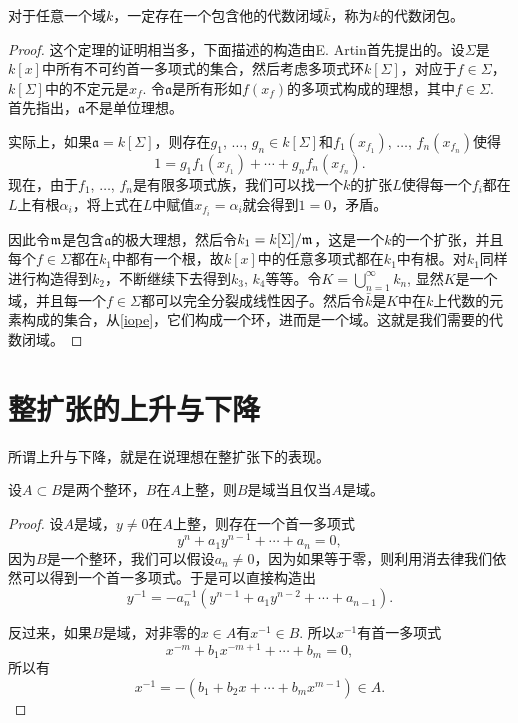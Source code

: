 \begin{thm}
对于任意一个域$k$，一定存在一个包含他的代数闭域$\bar{k}$，称为$k$的代数闭包。
\end{thm}

\begin{proof}
	这个定理的证明相当多，下面描述的构造由E. Artin首先提出的。设$\Sigma$是$k[x]$中所有不可约首一多项式的集合，然后考虑多项式环$k[\Sigma]$，对应于$f\in\Sigma$，$k[\Sigma]$中的不定元是$x_f$. 令$\mathfrak{a}$是所有形如$f(x_f)$的多项式构成的理想，其中$f\in\Sigma$. 首先指出，$\mathfrak{a}$不是单位理想。

	实际上，如果$\mathfrak{a}=k[\Sigma]$，则存在$g_1$, $\dots$, $g_n\in k[\Sigma]$和$f_1(x_{f_1})$, $\dots$, $f_n(x_{f_n})$使得
	\[
	1=g_1f_1(x_{f_1})+\cdots +g_nf_n(x_{f_n}).
	\]
	现在，由于$f_1$, $\dots$, $f_n$是有限多项式族，我们可以找一个$k$的扩张$L$使得每一个$f_i$都在$L$上有根$\alpha_i$，将上式在$L$中赋值$x_{f_i}=\alpha_i$就会得到$1=0$，矛盾。

	因此令$\mathfrak{m}$是包含$\mathfrak{a}$的极大理想，然后令$k_1=k[\Sigma]/\mathfrak{m}$，这是一个$k$的一个扩张，并且每个$f\in \Sigma$都在$k_1$中都有一个根，故$k[x]$中的任意多项式都在$k_1$中有根。对$k_1$同样进行构造得到$k_2$，不断继续下去得到$k_3$, $k_4$等等。令$K=\bigcup_{n=1}^\infty k_n$, 显然$K$是一个域，并且每一个$f\in \Sigma$都可以完全分裂成线性因子。然后令$\bar{k}$是$K$中在$k$上代数的元素构成的集合，从\ref{iope}，它们构成一个环，进而是一个域。这就是我们需要的代数闭域。
\end{proof}

\section{整扩张的上升与下降}

所谓上升与下降，就是在说理想在整扩张下的表现。

\begin{pro}
\label{intfield} 设$A\subset B$是两个整环，$B$在$A$上整，则$B$是域当且仅当$A$是域。
\end{pro}

\begin{proof}
	设$A$是域，$y\neq 0$在$A$上整，则存在一个首一多项式
	\[
	y^n+a_1y^{n-1}+\cdots+a_n=0,
	\]
	因为$B$是一个整环，我们可以假设$a_n\neq 0$，因为如果等于零，则利用消去律我们依然可以得到一个首一多项式。于是可以直接构造出
	\[
	y^{-1}=-a_n^{-1}(y^{n-1}+a_1y^{n-2}+\cdots+a_{n-1}).
	\]

	反过来，如果$B$是域，对非零的$x\in A$有$x^{-1}\in B$. 所以$x^{-1}$有首一多项式
	\[
	x^{-m}+b_1x^{-m+1}+\cdots+b_m=0,
	\]
	所以有
	\[
	x^{-1}=-(b_1+b_2x+\cdots+b_mx^{m-1})\in A.
	\]
\end{proof}

